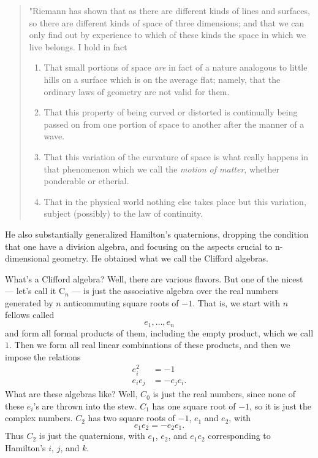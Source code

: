 \documentclass{article}
\begin{document}
\begin{quote}
"Riemann has shown that as there are different kinds of lines and
surfaces, so there are different kinds of space of three dimensions; and
that we can only find out by experience to which of these kinds the
space in which we live belongs. I hold in fact

\begin{enumerate}
\def\labelenumi{(\arabic{enumi})}
\item
  That small portions of space \emph{are} in fact of a nature analogous
  to little hills on a surface which is on the average flat; namely,
  that the ordinary laws of geometry are not valid for them.
\item
  That this property of being curved or distorted is continually being
  passed on from one portion of space to another after the manner of a
  wave.
\item
  That this variation of the curvature of space is what really happens
  in that phenomenon which we call the \emph{motion of matter}, whether
  ponderable or etherial.
\item
  That in the physical world nothing else takes place but this
  variation, subject (possibly) to the law of continuity.
\end{enumerate}
\end{quote}

He also substantially generalized Hamilton's quaternions, dropping the
condition that one have a division algebra, and focusing on the aspects
crucial to n-dimensional geometry. He obtained what we call the Clifford
algebras.

What's a Clifford algebra? Well, there are various flavors. But one of
the nicest --- let's call it \(\mathrm{C}_n\) --- is just the
associative algebra over the real numbers generated by \(n\)
anticommuting square roots of \(-1\). That is, we start with \(n\)
fellows called \[e_1, \ldots , e_n\] and form all formal products of
them, including the empty product, which we call \(1\). Then we form all
real linear combinations of these products, and then we impose the
relations \[
  \begin{aligned}
    e_i^2 &= -1
  \\e_ie_j &= -e_je_i.
  \end{aligned}
\] What are these algebras like? Well, \(C_0\) is just the real numbers,
since none of these \(e_i\)'s are thrown into the stew. \(C_1\) has one
square root of \(-1\), so it is just the complex numbers. \(C_2\) has
two square roots of \(-1\), \(e_1\) and \(e_2\), with
\[e_1 e_2 = - e_2 e_1.\] Thus \(C_2\) is just the quaternions, with
\(e_1\), \(e_2\), and \(e_1 e_2\) corresponding to Hamilton's \(i\),
\(j\), and \(k\).
\end{document}
